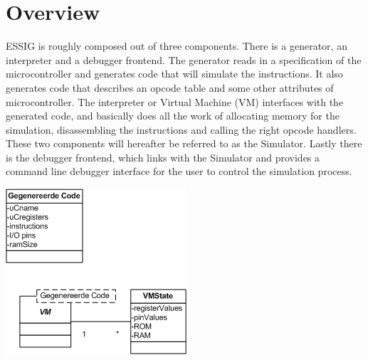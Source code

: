 \chapter{Overview}
\ac{ESSIG} is roughly composed out of three components. There is a generator,
an interpreter and a debugger frontend. The generator reads in a specification
of the microcontroller %
and generates code that will simulate the instructions. It also generates code
that describes an opcode table and some other attributes of microcontroller.
The interpreter or Virtual Machine (VM) interfaces with the generated code, and
basically does all the work of allocating memory for the simulation,
disassembling the instructions and calling the right opcode handlers. These two
components will hereafter be referred to as the Simulator. Lastly there is the
debugger frontend, which links with the Simulator and provides a command line
debugger interface for the user to control the simulation process.

\begin{center}
\includegraphics{diagrams/Model.png}
\end{center}
